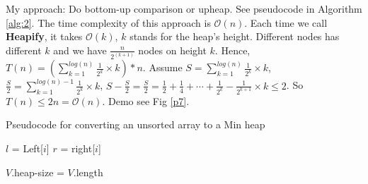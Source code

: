 \documentclass[11pt,largemargins]{homework}
\begin{document}
\question
My approach: Do bottom-up comparison or upheap. See pseudocode in Algorithm \ref{alg:2}. The time complexity of this approach is $\mathcal{O}(n)$. Each time we call \textbf{Heapify}, it takes $\mathcal{O}(k)$, $k$ stands for the heap's height. Different nodes has different $k$ and we have $\frac{n}{2^(k+1)}$ nodes on height $k$. Hence, $T(n)=\left(\sum_{k=1}^{log(n)} \frac{1}{2^{k}} \times k\right){*} n$. Assume $S=\sum_{k=1}^{log(n)} \frac{1}{2^{k}} \times k$, $\frac{S}{2} = \sum_{k=1}^{log(n)-1} \frac{1}{2^{k}} \times k$, $S - \frac{S}{2} = \frac{S}{2} = \frac{1}{2}+\frac{1}{4}+\cdots+\frac{1}{2^{k}}-\frac{1}{2^{k+1}} \times k \leq 2$. So $T(n) \leq 2n = \mathcal{O}(n)$. Demo see Fig \ref{p7}.
\begin{algorithm}
\label{alg:2}
\caption{Pseudocode for converting an unsorted array to a Min heap}
$l$ = Left[$i$]\;
$r$ = right[$i$]\;

$V$.heap-size = $V$.length\;
\end{algorithm}
\end{document}
